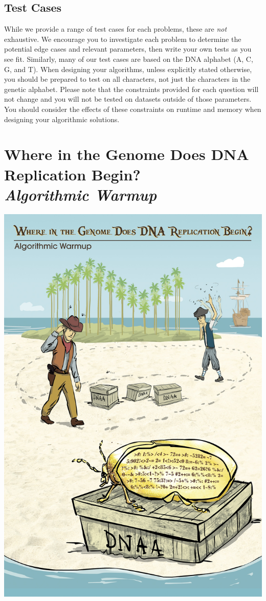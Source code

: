\documentclass{article}
\begin{document}
\subsection*{Test Cases}
\hline \vspace{5}
While we provide a range of test cases for each problems, these are \emph{not} exhaustive. We encourage you to investigate each problem to determine the potential edge cases and relevant parameters, then write your own tests as you see fit. Similarly, many of our test cases are based on the DNA alphabet (A, C, G, and T). When designing your algorithms, unless explicitly stated otherwise, you should be prepared to test on all characters, not just the characters in the genetic alphabet. Please note that the constraints provided for each question will not change and you will not be tested on datasets outside of those parameters. You should consider the effects of these constraints on runtime and memory when designing your algorithmic solutions.
\pagebreak

\tableofcontents
\pagebreak

\section{Where in the Genome Does DNA Replication Begin?\\ \normalfont\emph{Algorithmic Warmup}}
\begin{center}
    \includegraphics[scale=0.72]{c1/c1.jpg}
\end{center}
\pagebreak
\end{document}
